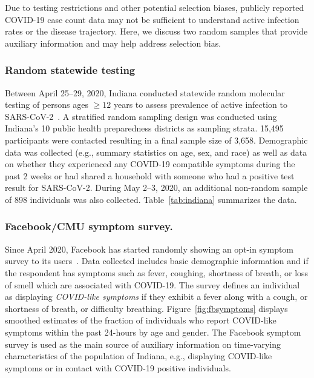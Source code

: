 \documentclass[11pt]{amsart}
\numberwithin{equation}{section}
\theoremstyle{plain}
\begin{document}
 Due to testing restrictions and other potential selection biases, publicly reported COVID-19 case count data may not be sufficient to understand active infection rates or the disease trajectory.  Here, we discuss two random samples that provide auxiliary information and may help address selection bias.

 \subsubsection{Random statewide testing}

 Between April 25--29, 2020, Indiana conducted statewide random molecular testing of persons ages $\geq 12$ years to assess prevalence of active infection to SARS-CoV-2~\citep{Yiannoutsos2021}. A stratified random sampling design was conducted using Indiana’s 10 public health preparedness districts as sampling strata. 15,495 participants were contacted resulting in a final sample size of 3,658. Demographic data was collected (e.g., summary statistics on age, sex, and race) as well as data on whether they experienced any COVID-19 compatible symptoms during the past 2 weeks or had shared a household with someone who had a positive test result for SARS-CoV-2. During May 2--3, 2020, an additional non-random sample of 898 individuals was also collected.
 Table~\ref{tab:indiana} summarizes the data.

 \subsubsection{Facebook/CMU symptom survey.}
 \label{subsection:fbsymptom}
 Since April 2020, Facebook has started randomly showing an opt-in symptom survey to its users~\citep{delphisurvey}.  Data collected includes basic demographic information and if the respondent has symptoms such as fever, coughing, shortness of breath, or loss of smell which are associated with COVID-19.  The survey defines an individual as displaying \emph{COVID-like symptoms} if they exhibit a fever along with a cough, or shortness of breath, or difficulty breathing.  Figure~\ref{fig:fbsymptoms} displays smoothed estimates of the fraction of individuals who report COVID-like symptoms within the past 24-hours by age and gender.  The Facebook symptom survey is used as the main source of auxiliary information on time-varying characteristics of the population of Indiana, e.g., displaying COVID-like symptoms or in contact with COVID-19 positive individuals.
\end{document}
